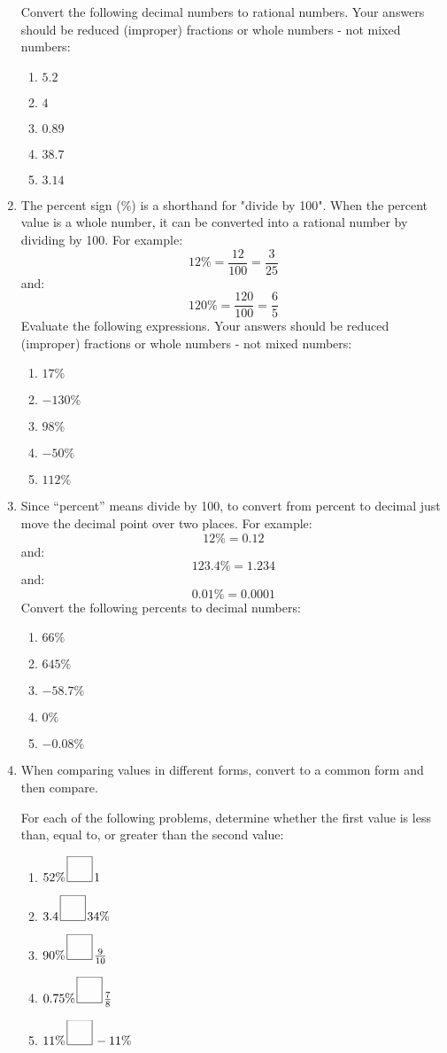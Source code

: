 \documentclass[letterpaper,12pt,fleqn]{article}
\begin{document}
\begin{enumerate}
  Convert the following decimal numbers to rational numbers. Your answers
  should be reduced (improper) fractions or whole numbers - not mixed numbers:
  \begin{enumerate}
  \item $5.2$
  \item $4$
  \item $0.89$
  \item $38.7$
  \item $3.14$
  \end{enumerate}

\item The percent sign (\%) is a shorthand for "divide by 100". When the
  percent value is a whole number, it can be converted into a rational number
  by dividing by 100. For example: 
  \[12\%=\frac{12}{100}=\frac{3}{25}\]
  and:
  \[120\%=\frac{120}{100}=\frac{6}{5}\]
  Evaluate the following expressions. Your answers should be reduced (improper)
  fractions or whole numbers - not mixed numbers:
  \begin{enumerate}
  \item $17\%$
  \item $-130\%$
  \item $98\%$
  \item $-50\%$
  \item $112\%$
  \end{enumerate}

\item Since ``percent'' means divide by 100, to convert from percent to decimal
  just move the decimal point over two places. For example: 
  \[12\%=0.12\]
  and:
  \[123.4\%=1.234\]
  and:
  \[0.01\%=0.0001\]
  Convert the following percents to decimal numbers:
  \begin{enumerate}
  \item $66\%$
  \item $645\%$
  \item $-58.7\%$
  \item $0\%$
  \item $-0.08\%$
  \end{enumerate}

\item When comparing values in different forms, convert to a common form and
  then compare.

  For each of the following problems, determine whether the first value is less
  than, equal to, or greater than the second value: 
  \begin{enumerate}
  \item $52\%\,\framebox(20,20){}\,1$
  \item $3.4\,\framebox(20,20){}\,34\%$
  \item $90\%\,\framebox(20,20){}\,\frac{9}{10}$
  \item $0.75\%\,\framebox(20,20){}\,\frac{7}{8}$
  \item $11\%\,\framebox(20,20){}\,-11\%$
  \end{enumerate}


\end{enumerate}
\end{document}
